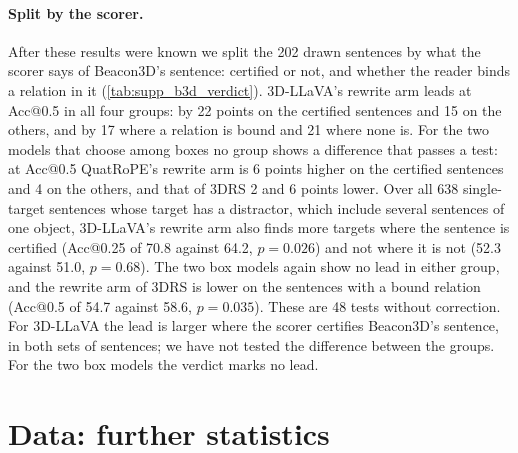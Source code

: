 \paragraph{Split by the scorer.}
After these results were known we split the 202 drawn sentences by what the scorer says of Beacon3D's sentence: certified or not, and whether the reader binds a relation in it (\cref{tab:supp_b3d_verdict}).
3D-LLaVA's rewrite arm leads at Acc@0.5 in all four groups: by 22 points on the certified sentences and 15 on the others, and by 17 where a relation is bound and 21 where none is.
For the two models that choose among boxes no group shows a difference that passes a test: at Acc@0.5 QuatRoPE's rewrite arm is 6 points higher on the certified sentences and 4 on the others, and that of 3DRS 2 and 6 points lower.
Over all 638 single-target sentences whose target has a distractor, which include several sentences of one object, 3D-LLaVA's rewrite arm also finds more targets where the sentence is certified (Acc@0.25 of 70.8 against 64.2, $p = 0.026$) and not where it is not (52.3 against 51.0, $p = 0.68$).
The two box models again show no lead in either group, and the rewrite arm of 3DRS is lower on the sentences with a bound relation (Acc@0.5 of 54.7 against 58.6, $p = 0.035$).
These are 48 tests without correction.
For 3D-LLaVA the lead is larger where the scorer certifies Beacon3D's sentence, in both sets of sentences; we have not tested the difference between the groups. For the two box models the verdict marks no lead.


\section{Data: further statistics}
\label{supp:data}
